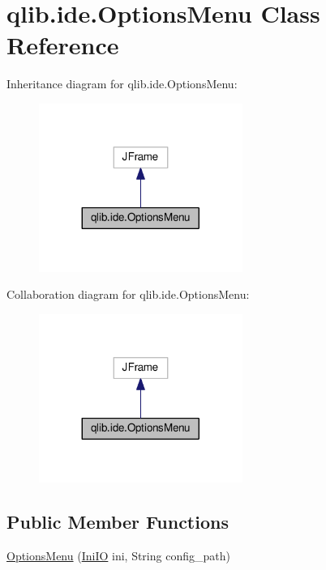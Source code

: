 \hypertarget{classqlib_1_1ide_1_1OptionsMenu}{}\section{qlib.\+ide.\+Options\+Menu Class Reference}
\label{classqlib_1_1ide_1_1OptionsMenu}


Inheritance diagram for qlib.\+ide.\+Options\+Menu\+:\nopagebreak
\begin{figure}[H]
\begin{center}
\leavevmode
\includegraphics[width=188pt]{classqlib_1_1ide_1_1OptionsMenu__inherit__graph}
\end{center}
\end{figure}


Collaboration diagram for qlib.\+ide.\+Options\+Menu\+:\nopagebreak
\begin{figure}[H]
\begin{center}
\leavevmode
\includegraphics[width=188pt]{classqlib_1_1ide_1_1OptionsMenu__coll__graph}
\end{center}
\end{figure}
\subsection*{Public Member Functions}
\begin{DoxyCompactItemize}
\item 
\hyperlink{classqlib_1_1ide_1_1OptionsMenu_a51481ab49936fea97fbf021ae7b37a13}{Options\+Menu} (\hyperlink{classqlib_1_1ide_1_1IniIO}{Ini\+IO} ini, String config\+\_\+path)
\end{DoxyCompactItemize}



